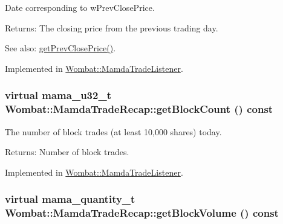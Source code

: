 Date corresponding to w\-Prev\-Close\-Price. 

\begin{Desc}
\item[Returns:]The closing price from the previous trading day. \end{Desc}
\begin{Desc}
\item[See also:]\hyperlink{classWombat_1_1MamdaTradeRecap_a612fcb5d25ec608317992115fd05349}{get\-Prev\-Close\-Price()}. \end{Desc}


Implemented in \hyperlink{classWombat_1_1MamdaTradeListener_ce42d352a2c3d93d2f7fd2d9131559e9}{Wombat::Mamda\-Trade\-Listener}.\hypertarget{classWombat_1_1MamdaTradeRecap_083bcc57e26be2e79bd391b8a2177e3f}{
\subsubsection[getBlockCount]{\setlength{\rightskip}{0pt plus 5cm}virtual mama\_\-u32\_\-t Wombat::Mamda\-Trade\-Recap::get\-Block\-Count () const}}
\label{classWombat_1_1MamdaTradeRecap_083bcc57e26be2e79bd391b8a2177e3f}


The number of block trades (at least 10,000 shares) today. 

\begin{Desc}
\item[Returns:]Number of block trades. \end{Desc}


Implemented in \hyperlink{classWombat_1_1MamdaTradeListener_ef024667c725e6c83fc55a2a356899b4}{Wombat::Mamda\-Trade\-Listener}.\hypertarget{classWombat_1_1MamdaTradeRecap_dc17d00de0594da995227b3f915d5fda}{
\subsubsection[getBlockVolume]{\setlength{\rightskip}{0pt plus 5cm}virtual mama\_\-quantity\_\-t Wombat::Mamda\-Trade\-Recap::get\-Block\-Volume () const}}
\label{classWombat_1_1MamdaTradeRecap_dc17d00de0594da995227b3f915d5fda}


